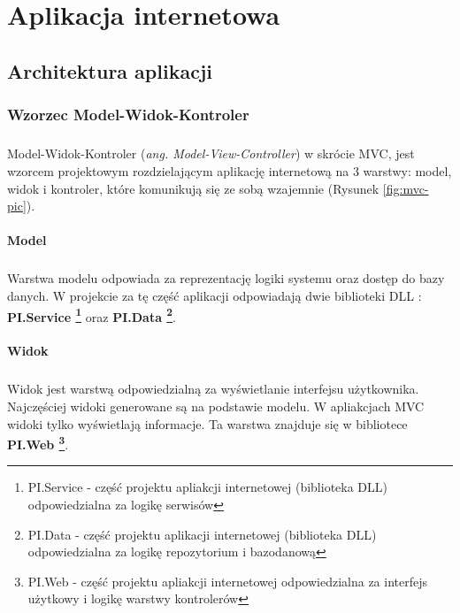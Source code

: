 \chapter{Aplikacja internetowa}

\label{cha:webapp}

\section{Architektura aplikacji} %
\label{sec:architektura_aplikacji}

\subsection{Wzorzec Model-Widok-Kontroler} %
\label{sub:wzorzec_model_widok_kontroler}
\paragraph{} %
\label{par:paragraph_name}
Model-Widok-Kontroler (\textit{ang. Model-View-Controller}) w skrócie MVC, jest wzorcem projektowym rozdzielającym aplikację internetową na 3 warstwy: model, widok i kontroler, które komunikują się ze sobą wzajemnie (Rysunek \ref{fig:mvc-pic}). 

\subsubsection{Model}
\paragraph{}
Warstwa modelu odpowiada za reprezentację logiki systemu oraz dostęp do bazy danych. W projekcie za tę część aplikacji odpowiadają dwie biblioteki DLL : \textbf{PI.Service \footnote{PI.Service - część projektu apliakcji internetowej (biblioteka DLL) odpowiedzialna za logikę serwisów}} oraz \textbf{PI.Data \footnote{PI.Data - część projektu aplikacji internetowej (biblioteka DLL) odpowiedzialna za logikę repozytorium i bazodanową}}.

\subsubsection{Widok}
\paragraph{}
Widok jest warstwą odpowiedzialną za wyświetlanie interfejsu użytkownika. Najczęściej widoki generowane są na podstawie modelu. W apliakcjach MVC widoki tylko wyświetlają informacje. Ta warstwa znajduje się w bibliotece \textbf{PI.Web \footnote{PI.Web - część projektu apliakcji internetowej odpowiedzialna za interfejs użytkowy i logikę warstwy kontrolerów}}.

